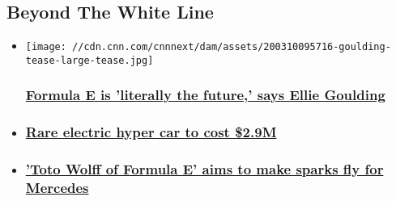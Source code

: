 \hypertarget{beyond-the-white-line-}{%
\subsection{Beyond The White Line~}\label{beyond-the-white-line-}}

\begin{itemize}
\item
  \href{/2020/03/10/motorsport/ellie-goulding-formula-e-supercharged-spt-intl/index.html}{}

  \texttt{[image: //cdn.cnn.com/cnnnext/dam/assets/200310095716-goulding-tease-large-tease.jpg]}

  \hypertarget{formula-e-is-literally-the-future-says-ellie-goulding}{%
  \subsubsection{\texorpdfstring{\href{/2020/03/10/motorsport/ellie-goulding-formula-e-supercharged-spt-intl/index.html}{Formula
  E is 'literally the future,' says Ellie
  Goulding}}{Formula E is 'literally the future,' says Ellie Goulding}}\label{formula-e-is-literally-the-future-says-ellie-goulding}}
\item
  \hypertarget{rare-electric-hyper-car-to-cost-29m}{%
  \subsubsection{\texorpdfstring{\href{/2020/03/03/motorsport/battista-anniversario-automobili-pininfarina-release-ev-spt-intl/index.html}{Rare
  electric hyper car to cost
  \$2.9M}}{Rare electric hyper car to cost \$2.9M}}\label{rare-electric-hyper-car-to-cost-29m}}
\item
  \hypertarget{toto-wolff-of-formula-e-aims-to-make-sparks-fly-for-mercedes}{%
  \subsubsection{\texorpdfstring{\href{/2020/03/11/motorsport/toto-wolff-of-formula-e-spt-intl/index.html}{'Toto
  Wolff of Formula E' aims to make sparks fly for
  Mercedes}}{'Toto Wolff of Formula E' aims to make sparks fly for Mercedes}}\label{toto-wolff-of-formula-e-aims-to-make-sparks-fly-for-mercedes}}
\end{itemize}

